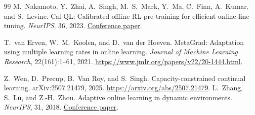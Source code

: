 \documentclass[11pt,twoside]{article}
\theoremstyle{definition}
\theoremstyle{remark}
\begin{document}
\begin{thebibliography}{99}
M.~Nakamoto, Y.~Zhai, A.~Singh, M.~S.~Mark, Y.~Ma,
C.~Finn, A.~Kumar, and S.~Levine.
\newblock Cal-QL: Calibrated offline RL pre-training for efficient online
fine-tuning.
\newblock \emph{NeurIPS}, 36, 2023.
\newblock \href{https://papers.neurips.cc/paper_files/paper/2023/file/c44a04289beaf0a7d968a94066a1d696-Paper-Conference.pdf}{Conference paper}.

T.~van Erven, W.~M.~Koolen, and D.~van der Hoeven.
\newblock MetaGrad: Adaptation using multiple learning rates in online learning.
\newblock \emph{Journal of Machine Learning Research}, 22(161):1--61, 2021.
\newblock \url{https://www.jmlr.org/papers/v22/20-1444.html}.

Z.~Wen, D.~Precup, B.~Van Roy, and S.~Singh.
\newblock Capacity-constrained continual learning.
\newblock arXiv:2507.21479, 2025.
\newblock \url{https://arxiv.org/abs/2507.21479}.
L.~Zhang, S.~Lu, and Z.-H.~Zhou.
\newblock Adaptive online learning in dynamic environments.
\newblock \emph{NeurIPS}, 31, 2018.
\newblock \href{https://proceedings.neurips.cc/paper/2018/file/10a5ab2db37feedfdeaab192ead4ac0e-Paper.pdf}{Conference paper}.
\end{thebibliography}
\end{document}
